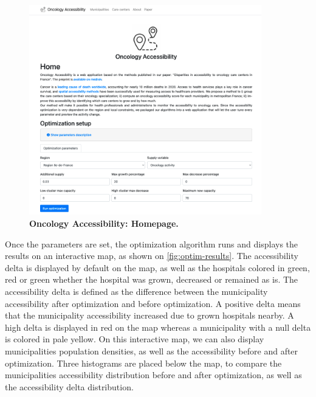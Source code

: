 \begin{figure}[H]
    \includegraphics[width=0.9\textwidth]{images/oncology-accessibility/home.png}
    \centering
    \caption{
        \textbf{Oncology Accessibility: Homepage.}
    }
    \label{fig:optim-form}
\end{figure}

Once the parameters are set, the optimization algorithm runs and displays the
results on an interactive map, as shown on \cref{fig:optim-results}. The
accessibility delta is displayed by default on the map, as well as the hospitals
colored in green, red or green whether the hospital was grown, decreased or
remained as is. The accessibility delta is defined as the difference between the
municipality accessibility after optimization and before optimization. A
positive delta means that the municipality accessibility increased due to grown
hospitals nearby. A high delta is displayed in red on the map whereas a
municipality with a null delta is colored in pale yellow. On this interactive
map, we can also display municipalities population densities, as well as the
accessibility before and after optimization. Three histograms are placed below
the map, to compare the municipalities accessibility distribution before and
after optimization, as well as the accessibility delta distribution.

